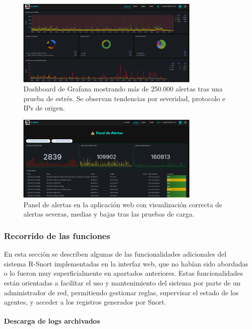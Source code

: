 \documentclass[11pt,a4paper,twoside]{report}
\begin{document}
\begin{figure}[H]
	\centering
	\includegraphics[width=0.8\textwidth]{pruebas/1.png}
	\caption{Dashboard de Grafana mostrando más de 250.000 alertas tras una prueba de estrés. Se observan tendencias por severidad, protocolo e IPs de origen.}
	\label{fig:alertas_masivas_grafana}
\end{figure}

\begin{figure}[H]
	\centering
	\includegraphics[width=0.8\textwidth]{pruebas/2.png}
	\caption{Panel de alertas en la aplicación web con visualización correcta de alertas severas, medias y bajas tras las pruebas de carga.}
	\label{fig:alertas_masivas_webapp}
\end{figure}

\subsubsection{Recorrido de las funciones}
\label{sec:funcionamiento}

En esta sección se describen algunas de las funcionalidades adicionales del sistema R-Snort implementadas en la interfaz web, que no habían sido abordadas o lo fueron muy superficialmente en apartados anteriores. Estas funcionalidades están orientadas a facilitar el uso y mantenimiento del sistema por parte de un administrador de red, permitiendo gestionar reglas, supervisar el estado de los agentes, y acceder a los registros generados por Snort.

\paragraph{Descarga de logs archivados}
\end{document}
